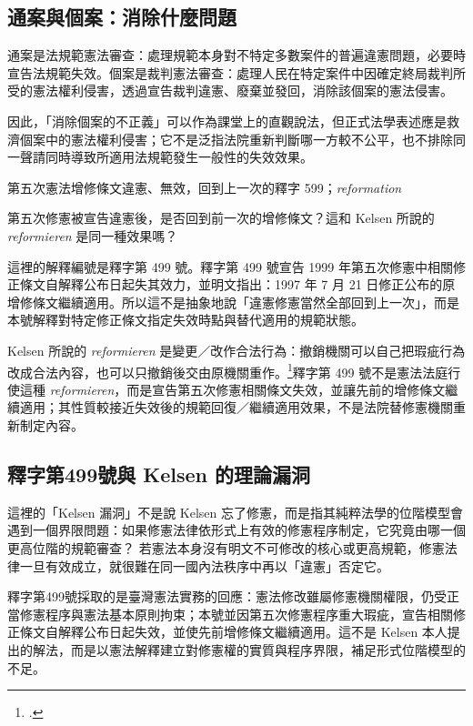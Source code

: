 \subsection{通案與個案：消除什麼問題}

通案是法規範憲法審查：處理規範本身對不特定多數案件的普遍違憲問題，必要時宣告法規範失效。個案是裁判憲法審查：處理人民在特定案件中因確定終局裁判所受的憲法權利侵害，透過宣告裁判違憲、廢棄並發回，消除該個案的憲法侵害。

因此，「消除個案的不正義」可以作為課堂上的直觀說法，但正式法學表述應是救濟個案中的憲法權利侵害；它不是泛指法院重新判斷哪一方較不公平，也不排除同一聲請同時導致所適用法規範發生一般性的失效效果。


\begin{qaprompt}
第五次憲法增修條文違憲、無效，回到上一次的釋字 599；\emph{reformation}
\end{qaprompt}

\begin{qaquestion}
第五次修憲被宣告違憲後，是否回到前一次的增修條文？這和 Kelsen 所說的 \emph{reformieren} 是同一種效果嗎？
\end{qaquestion}

這裡的解釋編號是釋字第 499 號。釋字第 499 號宣告 1999 年第五次修憲中相關修正條文自解釋公布日起失其效力，並明文指出：1997 年 7 月 21 日修正公布的原增修條文繼續適用。所以這不是抽象地說「違憲修憲當然全部回到上一次」，而是本號解釋對特定修正條文指定失效時點與替代適用的規範狀態。

Kelsen 所說的 \emph{reformieren} 是變更／改作合法行為：撤銷機關可以自己把瑕疵行為改成合法內容，也可以只撤銷後交由原機關重作。\footcites[43]{kelsen2015}[51]{kelsen1929}釋字第 499 號不是憲法法庭行使這種 \emph{reformieren}，而是宣告第五次修憲相關條文失效，並讓先前的增修條文繼續適用；其性質較接近失效後的規範回復／繼續適用效果，不是法院替修憲機關重新制定內容。

\subsection{釋字第499號與 Kelsen 的理論漏洞}

這裡的「Kelsen 漏洞」不是說 Kelsen 忘了修憲，而是指其純粹法學的位階模型會遇到一個界限問題：如果修憲法律依形式上有效的修憲程序制定，它究竟由哪一個更高位階的規範審查？ 若憲法本身沒有明文不可修改的核心或更高規範，修憲法律一旦有效成立，就很難在同一國內法秩序中再以「違憲」否定它。

釋字第499號採取的是臺灣憲法實務的回應：憲法修改雖屬修憲機關權限，仍受正當修憲程序與憲法基本原則拘束；本號並因第五次修憲程序重大瑕疵，宣告相關修正條文自解釋公布日起失效，並使先前增修條文繼續適用。這不是 Kelsen 本人提出的解法，而是以憲法解釋建立對修憲權的實質與程序界限，補足形式位階模型的不足。

